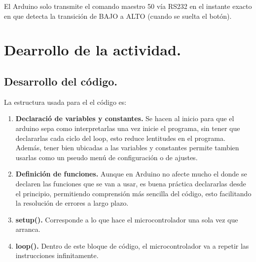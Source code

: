 \documentclass[conference]{IEEEtran}
\begin{document}
    El Arduino solo transmite el comando maestro 50 vía RS232 en el instante exacto en que detecta la transición de BAJO a ALTO (cuando se suelta el botón).


\section{Dearrollo de la actividad.}
  \subsection{Desarrollo del código.}
  La estructura usada para el el código es:
  \begin{enumerate}
    \item \textbf{Declaració de variables y constantes.} Se hacen al inicio para que el arduino sepa como interpretarlas una vez inicie el programa, sin tener que declararlas cada ciclo del loop, esto reduce lentitudes en el programa. Además, tener bien ubicadas a las variables y constantes permite tambien usarlas como un pseudo menú de configuración o de ajustes.
    \item \textbf{Definición de funciones.} Aunque en Arduino no afecte mucho el donde se declaren las funciones que se van a usar, es buena práctica declararlas desde el principio, permitiendo comprensión más sencilla del código, esto facilitando la resolución de errores a largo plazo.
    \item \textbf{setup().} Corresponde a lo que hace el microcontrolador una sola vez que arranca.
    \item \textbf{loop().} Dentro de este bloque de código, el microcontrolador va a repetir las instrucciones infinitamente.
  \end{enumerate}
\end{document}
